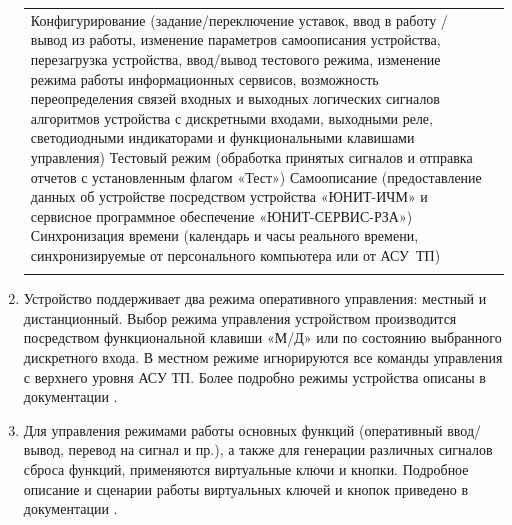 \begin{enumerate}
\begin{longtable}{|>{\centering\arraybackslash}m{3.2cm}|>{\raggedright\arraybackslash}m{13.7cm}|}
  Конфигурирование (задание/переключение уставок, ввод в работу / вывод из работы, изменение параметров самоописания устройства, перезагрузка устройства, ввод/вывод тестового режима, изменение режима работы информационных сервисов, возможность переопределения связей входных и выходных логических сигналов алгоритмов устройства с дискретными входами, выходными реле, светодиодными индикаторами и функциональными клавишами управления)\newline
  Тестовый режим (обработка принятых сигналов и отправка отчетов с установленным флагом «Тест»)\newline
  Самоописание (предоставление данных об устройстве посредством устройства «ЮНИТ-ИЧМ» и сервисное программное обеспечение «ЮНИТ-СЕРВИС-РЗА»)\newline
  Синхронизация времени (календарь и часы реального времени, синхронизируемые от персонального компьютера или от АСУ~ТП) \\ \hhline{|-|-|}
\end{longtable}
\endgroup

\item Устройство поддерживает два режима оперативного управления: местный и дистанционный.
Выбор режима управления устройством производится посредством функциональной клавиши «М/Д» или по состоянию выбранного дискретного входа.
В местном режиме игнорируются все команды управления с верхнего уровня АСУ ТП. Более подробно режимы устройства описаны в документации \ManualUnitGeneral.

\item Для управления режимами работы основных функций (оперативный ввод/вывод, перевод на сигнал и пр.), а также для генерации различных сигналов сброса функций, применяются виртуальные ключи и кнопки.
Подробное описание и сценарии работы виртуальных ключей и кнопок приведено в документации \ManualUnitGeneral.


\end{enumerate}

